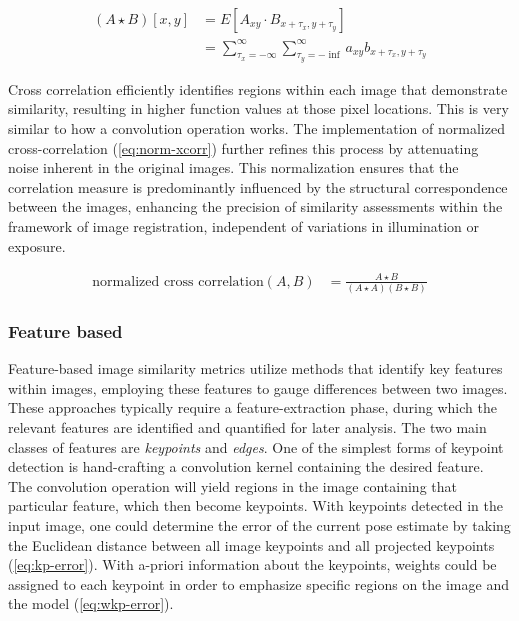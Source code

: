 \begin{equation}
    \begin{aligned}
        (A \star B)[x,y] &= E[A_{xy} \cdot B_{x + \tau_x,y+\tau_y}] \\
        &= \sum_{\tau_x=-\infty}^{\infty}\sum_{\tau_y=-\inf}^{\infty}a_{xy}b_{x + \tau_x,y + \tau_y}
    \end{aligned}
    \label{eq:xcorr}
\end{equation}

Cross correlation efficiently identifies regions within each image that demonstrate similarity, resulting in higher function values at those pixel locations.
This is very similar to how a convolution operation works.
The implementation of normalized cross-correlation (\cref{eq:norm-xcorr}) further refines this process by attenuating noise inherent in the original images.
This normalization ensures that the correlation measure is predominantly influenced by the structural correspondence between the images, enhancing the precision of similarity assessments within the framework of image registration, independent of variations in illumination or exposure.

\begin{equation}
    \begin{aligned}
        \text{normalized cross correlation}(A,B) &= \frac{A \star B}{(A \star A)(B \star B)}
    \end{aligned}\label{eq:norm-xcorr}
\end{equation}

\subsubsection{Feature based}
\label{sec:img-sim-feature}
Feature-based image similarity metrics utilize methods that identify key features within images, employing these features to gauge differences between two images.
These approaches typically require a feature-extraction phase, during which the relevant features are identified and quantified for later analysis.
The two main classes of features are \emph{keypoints} and \emph{edges}.
One of the simplest forms of keypoint detection is hand-crafting a convolution kernel containing the desired feature.
The convolution operation will yield regions in the image containing that particular feature, which then become keypoints.
With keypoints detected in the input image, one could determine the error of the current pose estimate by taking the Euclidean distance between all image keypoints and all projected keypoints \cite{burtonAutomaticTrackingHealthy2021} (\cref{eq:kp-error}).
With a-priori information about the keypoints, weights could be assigned to each keypoint in order to emphasize specific regions on the image and the model (\cref{eq:wkp-error}).

